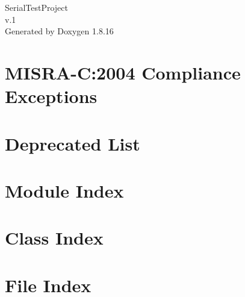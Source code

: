 \let\mypdfximage\pdfximage\def\pdfximage{\immediate\mypdfximage}\documentclass[twoside]{book}
\newcommand{\+}{\discretionary{\mbox{\scriptsize$\hookleftarrow$}}{}{}}
\newcommand{\clearemptydoublepage}{%
  \newpage{\pagestyle{empty}\cleardoublepage}%
}
\begin{document}
\hypersetup{pageanchor=false,
             bookmarksnumbered=true,
             pdfencoding=unicode
            }
\begin{titlepage}
\vspace*{7cm}
\begin{center}%
{\Large Serial\+Test\+Project \\[1ex]\large v.\+1 }\\
\vspace*{1cm}
{\large Generated by Doxygen 1.8.16}\\
\end{center}
\end{titlepage}
\clearemptydoublepage
{}
\tableofcontents
\clearemptydoublepage
{}
\hypersetup{pageanchor=true}

\chapter{M\+I\+S\+R\+A-\/C\+:2004 Compliance Exceptions}
\label{_c_m_s_i_s__m_i_s_r_a__exceptions}

\chapter{Deprecated List}
\label{deprecated}

\chapter{Module Index}

\chapter{Class Index}

\chapter{File Index}

\end{document}
